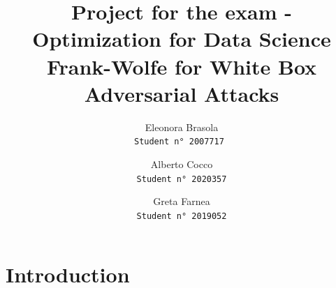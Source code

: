 \documentclass[10pt,twocolumn,letterpaper, english]{article}
\theoremstyle{definition}
\theoremstyle{plain}
\theoremstyle{plain}
\theoremstyle{plain}
\theoremstyle{plain}
\theoremstyle{remark}
\theoremstyle{remark}
\theoremstyle{definition}
\theoremstyle{definition}
\theoremstyle{definition}
\theoremstyle{definition}
\begin{document}
\title{{\large Project for the exam - Optimization for Data Science}\\Frank-Wolfe for White Box Adversarial Attacks}

\author{Eleonora Brasola\\
{\tt\small Student n° 2007717  }
\and
Alberto Cocco\\
{\tt\small Student n° 2020357}
\and 
Greta Farnea\\
{\tt\small Student n° 2019052}
}

\maketitle











\section{Introduction}
\end{document}
